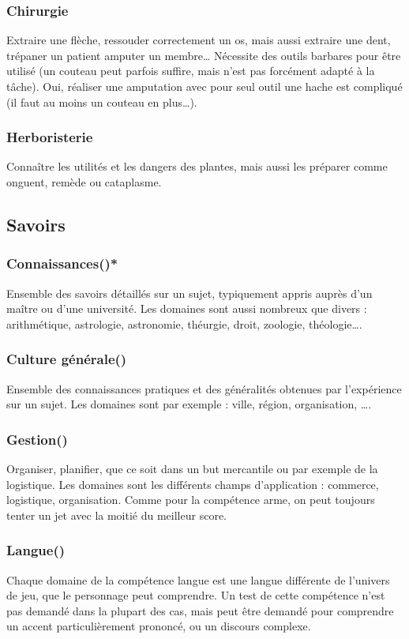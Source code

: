 \documentclass[10pt,a4paper,twocolumn]{book}
\begin{document}
\subsubsection{Chirurgie }
Extraire une flèche, ressouder correctement un os, mais aussi extraire une dent, trépaner un patient amputer un membre… Nécessite des outils barbares pour être utilisé (un couteau peut parfois suffire, mais n’est pas forcément adapté à la tâche). Oui, réaliser une amputation avec pour seul outil une hache est compliqué (il faut au moins un couteau en plus…).
\subsubsection{Herboristerie}
Connaître les utilités et les dangers des plantes, mais aussi les préparer comme onguent, remède ou cataplasme.
\subsection{Savoirs}
\subsubsection{Connaissances()*}
Ensemble des savoirs détaillés sur un sujet, typiquement appris auprès d’un maître ou d’une université. Les domaines sont aussi nombreux que divers : arithmétique, astrologie, astronomie, théurgie, droit, zoologie, théologie….
\subsubsection{Culture générale()}
Ensemble des connaissances pratiques et des généralités obtenues par l’expérience sur un sujet. Les domaines sont par exemple : ville, région, organisation, ….
\subsubsection{Gestion()}
Organiser, planifier, que ce soit dans un but mercantile ou par exemple de la logistique. Les domaines sont les différents champs d’application : commerce, logistique, organisation.  Comme pour la compétence arme, on peut toujours tenter un jet avec la moitié du meilleur score.
\subsubsection{Langue()}
Chaque domaine de la compétence langue est une langue différente de l’univers de jeu, que le personnage peut comprendre.
Un test de cette compétence n’est pas demandé dans la plupart des cas, mais peut être demandé pour comprendre un accent particulièrement prononcé, ou un discours complexe.
\end{document}
